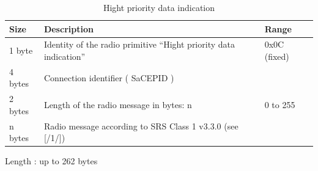 \documentclass[nocc]{template/openetcs_report}
\begin{document}
 			\begin{longtable}{|l|l|l|}
				\caption{Hight priority data indication}\\ 
				\hline
				
					\begin{minipage}[t]{0.1\linewidth} \textbf{Size}	\end{minipage}
				&	\begin{minipage}[t]{0.5\linewidth} \textbf{Description}	\end{minipage}
				&	\begin{minipage}[t]{0.3\linewidth} \textbf{Range} \end{minipage} \\
				
				\hline
					 \begin{minipage}[t]{0.1\linewidth}1 byte \end{minipage}
					&\begin{minipage}[t]{0.6\linewidth}Identity of the radio primitive "`Hight priority data indication"'	\end{minipage}
					&\begin{minipage}[t]{0.3\linewidth}0x0C (fixed) \end{minipage} \\
					
				\hline
					 \begin{minipage}[t]{0.1\linewidth}4 bytes \end{minipage}
					&\begin{minipage}[t]{0.6\linewidth}Connection identifier ( SaCEPID )	\end{minipage}
					&\begin{minipage}[t]{0.3\linewidth} \end{minipage} \\
					
				\hline
					 \begin{minipage}[t]{0.1\linewidth}2 bytes \end{minipage}
					&\begin{minipage}[t]{0.6\linewidth}Length of the radio message in bytes: n	\end{minipage}
					&\begin{minipage}[t]{0.3\linewidth}0 to 255 \end{minipage} \\
					
				\hline
					 \begin{minipage}[t]{0.1\linewidth}n bytes \end{minipage}
					&\begin{minipage}[t]{0.6\linewidth}Radio message according to SRS Class 1 v3.3.0 (see [/1/])	\end{minipage}
					&\begin{minipage}[t]{0.3\linewidth}\end{minipage} \\
					
				\hline	
			\end{longtable}
			Length : up to 262 bytes
\end{document}

